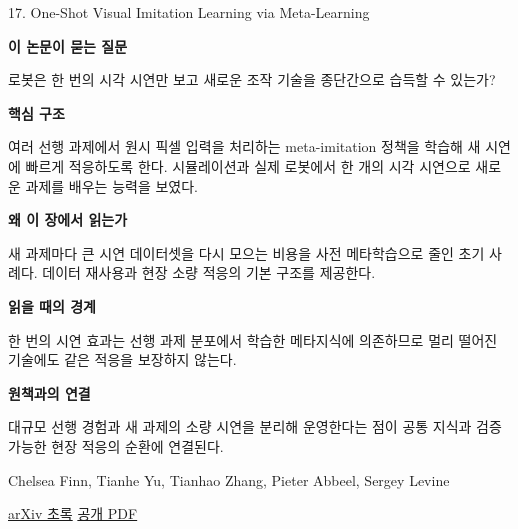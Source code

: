 \documentclass[11pt,openany]{book}
\begin{document}
\begin{termcard}{17. One-Shot Visual Imitation Learning via Meta-Learning}

\par

\medskip

{\sffamily\bfseries\color{deepblue} 이 논문이 묻는 질문}\par

로봇은 한 번의 시각 시연만 보고 새로운 조작 기술을 종단간으로 습득할 수 있는가?

\smallskip

{\sffamily\bfseries\color{deepblue} 핵심 구조}\par

여러 선행 과제에서 원시 픽셀 입력을 처리하는 meta-imitation 정책을 학습해 새 시연에 빠르게 적응하도록 한다. 시뮬레이션과 실제 로봇에서 한 개의 시각 시연으로 새로운 과제를 배우는 능력을 보였다.

\smallskip

{\sffamily\bfseries\color{deepblue} 왜 이 장에서 읽는가}\par

새 과제마다 큰 시연 데이터셋을 다시 모으는 비용을 사전 메타학습으로 줄인 초기 사례다. 데이터 재사용과 현장 소량 적응의 기본 구조를 제공한다.

\smallskip

{\sffamily\bfseries\color{coral} 읽을 때의 경계}\par

한 번의 시연 효과는 선행 과제 분포에서 학습한 메타지식에 의존하므로 멀리 떨어진 기술에도 같은 적응을 보장하지 않는다.

\smallskip

{\sffamily\bfseries\color{teal} 원책과의 연결}\par

대규모 선행 경험과 새 과제의 소량 시연을 분리해 운영한다는 점이 공통 지식과 검증 가능한 현장 적응의 순환에 연결된다.

\medskip

{\footnotesize\color{muted} Chelsea Finn, Tianhe Yu, Tianhao Zhang, Pieter Abbeel, Sergey Levine\par

\href{https://arxiv.org/abs/1709.04905}{arXiv 초록} \quad \href{https://arxiv.org/pdf/1709.04905}{공개 PDF}\par}

\end{termcard}
\end{document}
